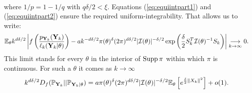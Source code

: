 \begin{proofb}
\begin{align}
\end{align}
where $1/p=1-1/q$ with $q\delta/2<\xi$. Equations (\ref{eq:equiintpart1}) and (\ref{eq:equiintpart2}) ensure the required uniform-integrability. %
That allows us to write:
    \begin{equation}
        \mathbb{E}_\theta k^{d\delta/2}\left|f\left(\frac{p_{\mathbf{Y}_k}(\mathbf{Y}_k)}{\ell_k(\mathbf{Y}_k|\theta)}\right)  - a k^{-d\delta/2}\pi(\theta)^\delta(2\pi)^{d\delta/2}|\mathcal{I}(\theta)|^{-\delta/2}\exp\left(\frac{\delta}{2} S_k^T\mathcal{I}(\theta)^{-1}S_k \right)  \right|
        \overset{\ }{\underset{k\rightarrow\infty}{\longrightarrow}}0.
    \end{equation}
This limit stands for every $\theta$ in the interior of $\operatorname{Supp}\pi$ within which $\pi$ is continuous. For such a $\theta$ it comes as $k\rightarrow\infty$
\begin{align}
    k^{d\delta/2} D_f(\mathbb{P}_{\mathbf{Y}_k} || \mathbb{P}_{\mathbf{Y}_k|\theta}) = a\pi(\theta)^\delta(2\pi)^{d\delta/2}|\mathcal{I}(\theta)|^{-\delta/2}\mathbb{E}_\theta\left[e^{\frac{\delta}{2} \|X_k\|^2}\right] + o(1).    
\end{align}


\end{proofb}
